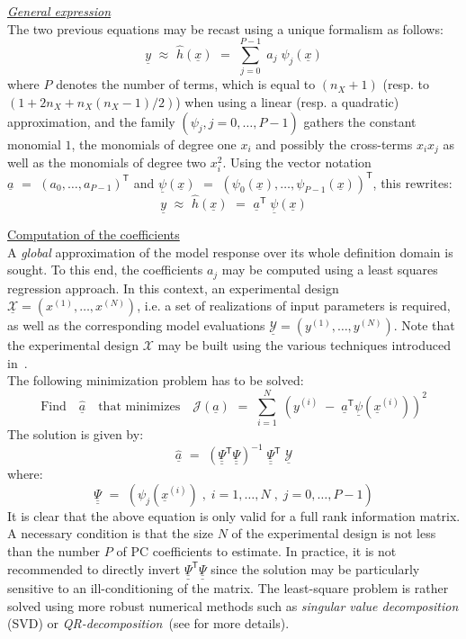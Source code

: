 {\underline{\textit{General expression}}\\

The two previous equations may be recast using a unique formalism as follows:
$$
\underline{y} \, \, \approx \, \, \widehat{h}(\underline{x}) \, \, = \, \, \sum_{j=0}^{P-1} \; a_j \; \psi_j(\underline{x})
$$
where $P$ denotes the number of terms, which is equal to $(n_X + 1)$ (resp. to $(1 + 2n_X + n_X (n_X - 1)/2)$) when using a linear (resp. a quadratic) approximation, and the family $(\psi_j,j=0,\dots,P-1)$ gathers the constant monomial $1$, the monomials of degree one $x_i$ and possibly the cross-terms $x_i x_j$ as well as the monomials of degree two $x_i^2$. Using the vector notation $\underline{a} \, \, = \, \, (a_{0} , \dots , a_{P-1} )^{\textsf{T}}$ and $\underline{\psi}(\underline{x}) \, \, = \, \, (\psi_{0}(\underline{x}) , \dots , \psi_{P-1}(\underline{x}) )^{\textsf{T}}$, this rewrites:
$$
\underline{y} \, \, \approx \, \, \widehat{h}(\underline{x}) \, \, = \, \, \underline{a}^{\textsf{T}} \; \underline{\psi}(\underline{x})
$$

\underline{Computation of the coefficients}\\

A \emph{global} approximation of the model response over its whole definition domain is sought. To this end, the coefficients $a_j$ may be computed using a least squares regression approach. In this context, an experimental design $\underline{\mathcal{X}} =(x^{(1)},\dots,x^{(N)})$, i.e. a set of realizations of input parameters is required, as well as the corresponding model evaluations $\underline{\mathcal{Y}} =(y^{(1)},\dots,y^{(N)})$. Note that the experimental design $\mathcal{X}$ may be built using the various techniques introduced in~. \\

The following minimization problem has to be solved:
$$ 
\mbox{Find} \quad \widehat{\underline{a}} \quad \mbox{that minimizes} \quad \mathcal{J}(\underline{a}) \, \, = \, \, \sum_{i=1}^N \; \left( y^{(i)} \; - \; \underline{a}^{\textsf{T}}  \underline{\psi}(\underline{x}^{(i)}) \right)^2
$$
The solution is given by:
$$ \widehat{\underline{a}} \, \, = \, \, \left( \underline{\underline{\Psi}}^{\textsf{T}} \underline{\underline{\Psi}}  \right)^{-1} \; \underline{\underline{\Psi}}^{\textsf{T}}  \; \underline{\mathcal{Y}} $$
where:
$$\underline{\underline{\Psi}} \, \, = \, \, (\psi_{j}(\underline{x}^{(i)}) \; , \; i=1,\dots,N \; , \; j = 0,\dots,P-1) $$
It is clear that the above equation is only valid for a full rank information matrix. A necessary condition is that the size $N$ of the experimental design is not less than the number $P$ of PC coefficients to estimate. In practice, it is not recommended to directly invert $\underline{\underline{\Psi}}^{\textsf{T}} \underline{\underline{\Psi}}$ since the solution may be particularly sensitive to an ill-conditioning of the matrix. The least-square problem is rather solved using more robust numerical methods such as \emph{singular value decomposition} (SVD) or \emph{QR-decomposition}~(see  for more details). \\

}
